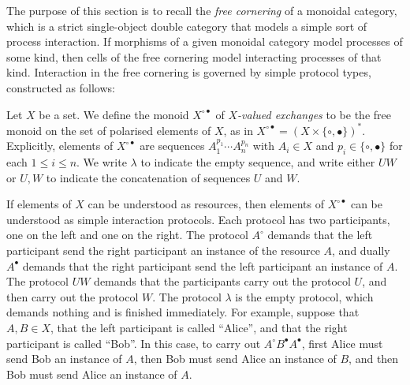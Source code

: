 \documentclass[twoside,11pt,final]{entics}
\newcommand{\ex}[1]{{#1}^{\circ\bullet}}
\begin{document}
The purpose of this section is to recall the \emph{free cornering} of a monoidal category, which is a strict single-object double category that models a simple sort of process interaction. If morphisms of a given monoidal category model processes of some kind, then cells of the free cornering model interacting processes of that kind. Interaction in the free cornering is governed by simple protocol types, constructed as follows:

\begin{definition}\label{def:exchanges}
  Let $X$ be a set. We define the monoid $\ex{X}$ of \emph{$X$-valued exchanges} to be the free monoid on the set of polarised elements of $X$, as in $\ex{X} = (X \times \{\circ,\bullet\})^*$. Explicitly, elements of $\ex{X}$ are sequences $A_1^{p_1}\cdots A_n^{p_n}$ with $A_i \in X$ and $p_i \in \{\circ,\bullet\}$ for each $1 \leq i \leq n$. We write $\lambda$ to indicate the empty sequence, and write either $UW$ or $U,W$ to indicate the concatenation of sequences $U$ and $W$.
\end{definition}

If elements of $X$ can be understood as resources, then elements of $\ex{X}$ can be understood as simple interaction protocols. Each protocol has two participants, one on the left and one on the right. The protocol $A^\circ$ demands that the left participant send the right participant an instance of the resource $A$, and dually $A^\bullet$ demands that the right participant send the left participant an instance of $A$. The protocol $UW$ demands that the participants carry out the protocol $U$, and then carry out the protocol $W$. The protocol $\lambda$ is the empty protocol, which demands nothing and is finished immediately. For example, suppose that $A,B \in X$, that the left participant is called ``Alice'', and that the right participant is called ``Bob''. In this case, to carry out $A^\circ B^\bullet A^\bullet$, first Alice must send Bob an instance of $A$, then Bob must send Alice an instance of $B$, and then Bob must send Alice an instance of $A$.
\end{document}
